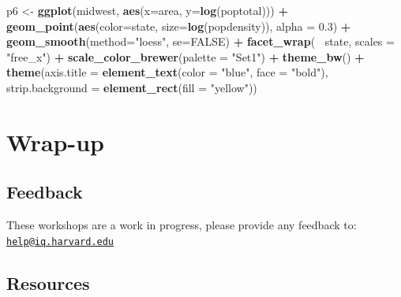 \documentclass[]{book}
\newenvironment{Shaded}{\begin{snugshade}}{\end{snugshade}}
\newcommand{\KeywordTok}[1]{\textcolor[rgb]{0.13,0.29,0.53}{\textbf{#1}}}
\newcommand{\DataTypeTok}[1]{\textcolor[rgb]{0.13,0.29,0.53}{#1}}
\newcommand{\FloatTok}[1]{\textcolor[rgb]{0.00,0.00,0.81}{#1}}
\newcommand{\StringTok}[1]{\textcolor[rgb]{0.31,0.60,0.02}{#1}}
\newcommand{\OtherTok}[1]{\textcolor[rgb]{0.56,0.35,0.01}{#1}}
\newcommand{\OperatorTok}[1]{\textcolor[rgb]{0.81,0.36,0.00}{\textbf{#1}}}
\newcommand{\NormalTok}[1]{#1}
\begin{document}
\begin{Shaded}
\begin{Highlighting}[]
\NormalTok{p6 <-}\StringTok{ }\KeywordTok{ggplot}\NormalTok{(midwest, }\KeywordTok{aes}\NormalTok{(}\DataTypeTok{x=}\NormalTok{area, }\DataTypeTok{y=}\KeywordTok{log}\NormalTok{(poptotal))) }\OperatorTok{+}
\StringTok{    }\KeywordTok{geom_point}\NormalTok{(}\KeywordTok{aes}\NormalTok{(}\DataTypeTok{color=}\NormalTok{state, }\DataTypeTok{size=}\KeywordTok{log}\NormalTok{(popdensity)), }\DataTypeTok{alpha =} \FloatTok{0.3}\NormalTok{) }\OperatorTok{+}
\StringTok{    }\KeywordTok{geom_smooth}\NormalTok{(}\DataTypeTok{method=}\StringTok{"loess"}\NormalTok{, }\DataTypeTok{se=}\OtherTok{FALSE}\NormalTok{) }\OperatorTok{+}
\StringTok{    }\KeywordTok{facet_wrap}\NormalTok{(}\OperatorTok{~}\StringTok{ }\NormalTok{state, }\DataTypeTok{scales =} \StringTok{"free_x"}\NormalTok{) }\OperatorTok{+}
\StringTok{    }\KeywordTok{scale_color_brewer}\NormalTok{(}\DataTypeTok{palette =} \StringTok{"Set1"}\NormalTok{) }\OperatorTok{+}
\StringTok{    }\KeywordTok{theme_bw}\NormalTok{() }\OperatorTok{+}
\StringTok{    }\KeywordTok{theme}\NormalTok{(}\DataTypeTok{axis.title =} \KeywordTok{element_text}\NormalTok{(}\DataTypeTok{color =} \StringTok{"blue"}\NormalTok{, }\DataTypeTok{face =} \StringTok{"bold"}\NormalTok{),}
         \DataTypeTok{strip.background =} \KeywordTok{element_rect}\NormalTok{(}\DataTypeTok{fill =} \StringTok{"yellow"}\NormalTok{))}
\end{Highlighting}
\end{Shaded}

\section{Wrap-up}\label{wrap-up-3}

\subsection{Feedback}\label{feedback-3}

These workshops are a work in progress, please provide any feedback to:
\href{mailto:help@iq.harvard.edu}{\nolinkurl{help@iq.harvard.edu}}

\subsection{Resources}\label{resources-4}
\end{document}
